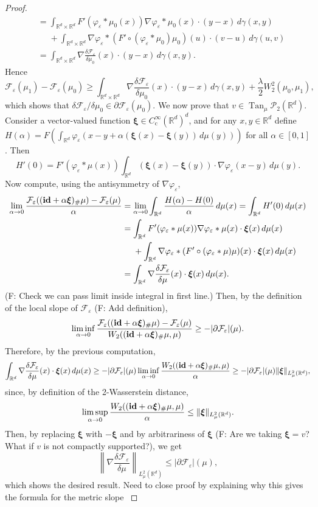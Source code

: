 \documentclass[11pt,leqno]{amsart}
\theoremstyle{definition}
\newcommand{\bes}{\begin{equation*}}
\newcommand{\ees}{\end{equation*}}
\newcommand{\comment}[1]{{\color{red}#1}} %
\newcommand{\R}{{\mathord{\mathbb R}}}
\newcommand{\id}{{\mathop{\rm \mathbf{id} }}}
\newcommand{\F}{\mathcal{F}}
\def\P{{\mathcal P}}
\def\e{\varepsilon}
\newcommand{\ird}{\int_{\mathord{\mathbb R}^d}}
\newcommand{\irdrd}{\int_{\mathord{\mathbb R}^d \times \mathord{\mathbb R}^d}}
\def\F{\mathcal{F}}
\DeclareMathOperator{\Tan}{Tan}
\begin{document}
\begin{proof}
\begin{align*}
	&= \irdrd F'(\varphi_\e*\mu_0(x)) \nabla\varphi_\e*\mu_0(x)\cdot(y-x)\,d\gamma(x,y)\\
	&\phantom{{}={}} + \irdrd \nabla\varphi_\e* (F'\circ (\varphi_\e*\mu_0)\mu_0)(u) \cdot (v-u) \,d\gamma(u,v)\\
	&= \irdrd \nabla \frac{\delta \F_\e}{\delta \mu_0}(x) \cdot (y-x) \,d\gamma(x,y).
\end{align*}
Hence 
\bes
	\F_\e(\mu_1) - \F_\e(\mu_0) \geq \irdrd \nabla \frac{\delta \F_\e}{\delta \mu_0}(x) \cdot (y-x) \,d\gamma(x,y) + \frac{\lambda}{2}W_2^2(\mu_0,\mu_1),
\ees
which shows that $\delta \F_\e/\delta \mu_0 \in \partial  \F_\e(\mu_0)$. We now prove that $v \in \Tan_\mu\P_2(\R^d)$. Consider a vector-valued function $\boldsymbol{\xi} \in C_\mathrm{c}^\infty(\R^d)^d$, and for any $x,y\in\R^d$ define $H(\alpha) = F(\ird \varphi_\e(x-y + \alpha(\boldsymbol{\xi}(x) - \boldsymbol{\xi}(y))\,d\mu(y)))$ for all $\alpha\in[0,1]$. Then
\bes
	H'(0) = F'(\varphi_\e*\mu(x)) \ird (\boldsymbol{\xi}(x) - \boldsymbol{\xi}(y)) \cdot \nabla \varphi_\e(x-y) \,d\mu(y).
\ees
Now compute, using the antisymmetry of $\nabla \varphi_\e$,
\begin{align*}
	\lim_{\alpha \to0} \frac{\F_\e((\id + \alpha \boldsymbol{\xi})_\#\mu) - \F_\e(\mu)}{\alpha} &= \lim_{\alpha\to0} \ird \frac{H(\alpha)-H(0)}{\alpha} \,d\mu(x) = \ird H'(0) \,d\mu(x)\\
	&= \ird F'(\varphi_\e*\mu(x)) \nabla \varphi_\e*\mu(x) \cdot \boldsymbol{\xi}(x) \,d\mu(x)\\
	&\phantom{{}={}}+ \ird \nabla\varphi_\e * (F'\circ(\varphi_\e*\mu)\mu)(x) \cdot \boldsymbol{\xi}(x) \,d\mu(x)\\
	&= \ird \nabla \frac{\delta \F_\e}{\delta \mu}(x) \cdot \boldsymbol{\xi}(x) \, d\mu(x).
\end{align*}
\comment{(F: Check we can pass limit inside integral in first line.)} Then, by the definition of the local slope of $\F_\e$ \comment{(F: Add definition)},
\bes
	\liminf_{\alpha \to 0} \frac{\F_\e((\id + \alpha \boldsymbol{\xi})_\#\mu) - \F_\e(\mu)}{W_2((\id + \alpha \boldsymbol{\xi})_\#\mu,\mu)} \geq - |\partial \F_\e|(\mu).
\ees
Therefore, by the previous computation,
\bes
	\ird \nabla \frac{\delta \F_\e}{\delta \mu}(x) \cdot \boldsymbol{\xi}(x) \, d\mu(x) \geq -|\partial \F_\e|(\mu) \liminf_{\alpha\to0} \frac{W_2((\id + \alpha \boldsymbol{\xi})_\#\mu,\mu)}{\alpha} \geq -|\partial \F_\e|(\mu) \|\boldsymbol{\xi}\|_{L^2_\mu(\R^d)},
\ees
since, by definition of the 2-Wasserstein distance,
\bes
	\limsup_{\alpha\to0}  \frac{W_2((\id + \alpha \boldsymbol{\xi})_\#\mu,\mu)}{\alpha} \leq \|\boldsymbol{\xi}\|_{L^2_\mu(\R^d)}.
\ees
Then, by replacing $\boldsymbol{\xi}$ with $-\boldsymbol{\xi}$ and by arbitrariness of $\boldsymbol{\xi}$ \comment{(F: Are we taking $\boldsymbol{\xi} = v$? What if $v$ is not compactly supported?)}, we get
\bes
	\left\| \nabla \frac{\delta \F_\e}{\delta\mu}\right\|_{L^2_\mu(\R^d)} \leq |\partial \F_\e|(\mu),
\ees
which shows the desired result.
{\color{Aquamarine} Need to close proof by explaining why this gives the formula for the metric slope }
\end{proof}
\end{document}
